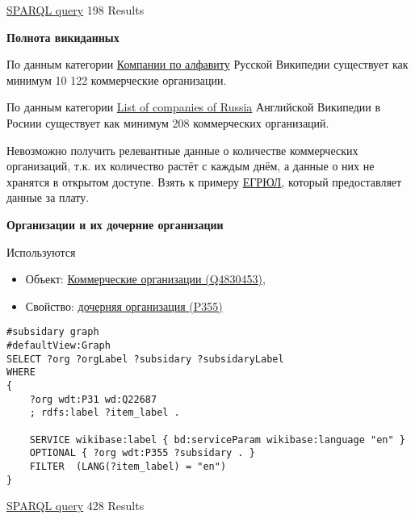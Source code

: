 \href{https://query.wikidata.org/#SELECT%20%3FcountryLabel%20%28count%28%3Forg%29%20as%20%3Fcount%29%0AWHERE%0A%7B%0A%20%20%20%20%3Forg%20%20wdt%3AP31%20wd%3AQ4830453.%0A%20%20%20%20%3Forg%20wdt%3AP17%20%3Fcountry.%0A%0A%20%20SERVICE%20wikibase%3Alabel%20%7B%20bd%3AserviceParam%20wikibase%3Alanguage%20%22en%22%20%7D%0A%20%7D%0A%20%20GROUP%20BY%20%3Fcountry%20%3FcountryLabel%0A%20%20ORDER%20BY%20DESC%20%28%3Fcount%29%0A}{SPARQL query} 198 Results

\textbf{Полнота викиданных}

По данным категории \href{https://ru.wikipedia.org/wiki/%D0%9A%D0%B0%D1%82%D0%B5%D0%B3%D0%BE%D1%80%D0%B8%D1%8F:%D0%9A%D0%BE%D0%BC%D0%BF%D0%B0%D0%BD%D0%B8%D0%B8_%D0%BF%D0%BE_%D0%B0%D0%BB%D1%84%D0%B0%D0%B2%D0%B8%D1%82%D1%83}{Компании по алфавиту} Русской Википедии существует как минимум 10 122 коммерческие организации.

По данным категории \href{https://en.wikipedia.org/wiki/List_of_companies_of_Russia}{List of companies of Russia} Английской Википедии в Росиии существует как минимум 208 коммерческих организаций.

Невозможно получить релевантные данные о количестве коммерческих организаций, т.к. их количество растёт с каждым днём, а данные о них не хранятся в открытом доступе. Взять к примеру \href{https://www.nalog.ru/rn77/service/egrip2/}{ЕГРЮЛ}, который предоставляет данные за плату.

\textbf{Организации и их дочерние организации}

Используются

\begin{itemize}
    \item Объект: \href{https://www.wikidata.org/wiki/Q4830453}{Коммерческие организации (Q4830453)},
    \item Свойство: \href{https://www.wikidata.org/wiki/Property:P355}{дочерняя организация (P355)}
\end{itemize}

\begin{lstlisting}[language=SPARQL]
#subsidary graph
#defaultView:Graph
SELECT ?org ?orgLabel ?subsidary ?subsidaryLabel
WHERE
{
    ?org wdt:P31 wd:Q22687
    ; rdfs:label ?item_label .

    SERVICE wikibase:label { bd:serviceParam wikibase:language "en" }
    OPTIONAL { ?org wdt:P355 ?subsidary . }
    FILTER  (LANG(?item_label) = "en") 
}
\end{lstlisting}

\href{https://query.wikidata.org/#%23neighboring%20countries%20graph%0A%23defaultView%3AGraph%0ASELECT%20%3Forg%20%3ForgLabel%20%3Fsubsidary%20%3FsubsidaryLabel%0AWHERE%0A%7B%0A%20%20%20%20%3Forg%20wdt%3AP31%20wd%3AQ22687%0A%20%20%20%20%3B%20rdfs%3Alabel%20%3Fitem_label%20.%0A%0A%20%20%20%20SERVICE%20wikibase%3Alabel%20%7B%20bd%3AserviceParam%20wikibase%3Alanguage%20%22en%22%20%7D%0A%20%20%20%20OPTIONAL%20%7B%20%3Forg%20wdt%3AP355%20%3Fsubsidary%20.%20%7D%0A%20%20%20%20FILTER%20%20%28LANG%28%3Fitem_label%29%20%3D%20%22en%22%29%20%0A%7D%0A}{SPARQL query} 428 Results  
